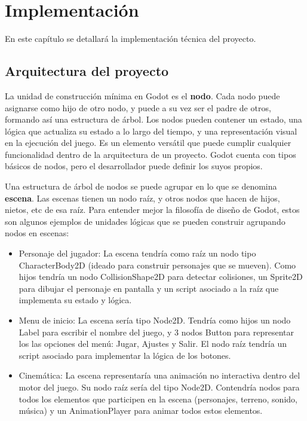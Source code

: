 \chapter{Implementación}

En este capítulo se detallará la implementación técnica del proyecto.

\section{Arquitectura del proyecto}

La unidad de construcción mínima en Godot es el \textbf{nodo}. Cada nodo puede asignarse como hijo de otro nodo, y puede a su vez ser el padre de otros, formando así una estructura de árbol. Los nodos pueden contener un estado, una lógica que actualiza su estado a lo largo del tiempo, y una representación visual en la ejecución del juego. Es un elemento versátil que puede cumplir cualquier funcionalidad dentro de la arquitectura de un proyecto. Godot cuenta con tipos básicos de nodos, pero el desarrollador puede definir los suyos propios.

Una estructura de árbol de nodos se puede agrupar en lo que se denomina \textbf{escena}. Las escenas tienen un nodo raíz, y otros nodos que hacen de hijos, nietos, etc de esa raíz. Para entender mejor la filosofía de diseño de Godot, estos son algunos ejemplos de unidades lógicas que se pueden construir agrupando nodos en escenas:

\begin{itemize}
    \item Personaje del jugador: La escena tendría como raíz un nodo tipo CharacterBody2D (ideado para construir personajes que se mueven). Como hijos tendría un nodo CollisionShape2D para detectar colisiones, un Sprite2D para dibujar el personaje en pantalla y un script asociado a la raíz que implementa su estado y lógica.
    \item Menu de inicio: La escena sería tipo Node2D. Tendría como hijos un nodo Label para escribir el nombre del juego, y 3 nodos Button para representar los las opciones del menú: Jugar, Ajustes y Salir. El nodo raíz tendría un script asociado para implementar la lógica de los botones.
    \item Cinemática: La escena representaría una animación no interactiva dentro del motor del juego. Su nodo raíz sería del tipo Node2D. Contendría nodos para todos los elementos que participen en la escena (personajes, terreno, sonido, música) y un AnimationPlayer para animar todos estos elementos.
\end{itemize}

